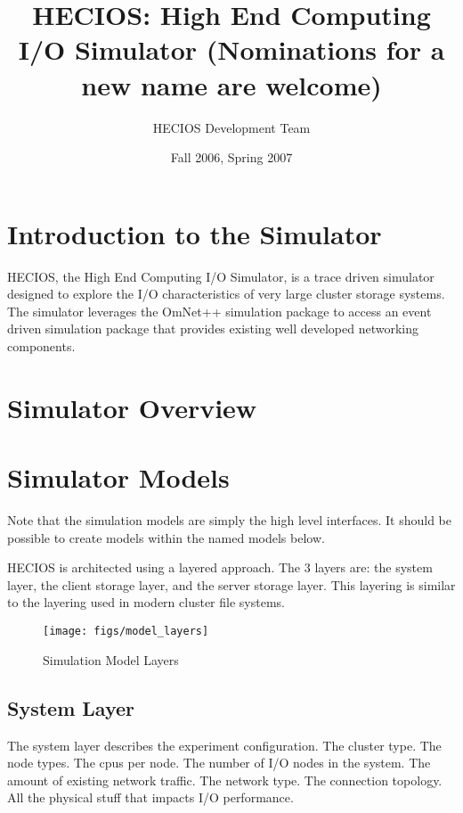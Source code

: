 \documentclass[11pt]{article}
\title{HECIOS: High End Computing I/O Simulator 
       (Nominations for a new name are welcome)}
\author{HECIOS Development Team}
\date{Fall 2006, Spring 2007}
\begin{document}
\maketitle
\newpage

\setcounter{tocdepth}{2}
\tableofcontents

%
%
\setlength{\parindent}{0pt}
\setlength{\parskip}{11pt}

%
%
\section{Introduction to the Simulator}
HECIOS, the High End Computing I/O Simulator, is a trace driven simulator
designed to explore the I/O characteristics of very large cluster storage
systems.  The simulator leverages the OmNet++ simulation package to access an
event driven simulation package that provides existing well developed
networking components.

\section{Simulator Overview}

\section{Simulator Models}
Note that the simulation models are simply the high level interfaces.  It
should be possible to create models within the named models below.

HECIOS is architected using a layered approach.  The 3 layers are: the system
layer, the client storage layer, and the server storage layer.  This layering
is similar to the layering used in modern cluster file systems.
 
\begin{figure}[t]
  \begin{center}
    \texttt{[image: figs/model\_layers]}
  \end{center}
  \caption{Simulation Model Layers \label{fig:model-layers}}
\end{figure}

\subsection{System Layer}
The system layer describes the experiment configuration.  The cluster type.
The node types.  The cpus per node.  The number of I/O nodes in the system.
The amount of existing network traffic.  The network type.  The connection
topology.  All the physical stuff that impacts I/O performance.
\end{document}
